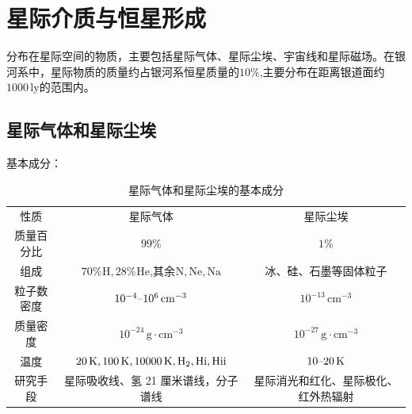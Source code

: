 \documentclass[../天体物理基础.tex]{subfiles}
\begin{document}
\section{星际介质与恒星形成}
分布在星际空间的物质，主要包括星际气体、星际尘埃、宇宙线和星际磁场。在银河系中，星际物质的质量约占银河系恒星质量的$10\%$,主要分布在距离银道面约$1000\,\mathrm{ly}$的范围内。

\subsection{星际气体和星际尘埃}
基本成分：
\begin{table}[!htbp]
\centering
\caption{星际气体和星际尘埃的基本成分}
\begin{tabular}{c c c}
\hline
性质 & 星际气体 & 星际尘埃\\
\cline{1-3}
质量百分比 & $99\%$ & $1\%$\\
\cline{1-3}
组成 & $70\%{}^{}\mathrm{H},28\%{}^{}\mathrm{He}$,其余${}^{}\mathrm{N,Ne,Na}$ & 冰、硅、石墨等固体粒子\\
\cline{1-3}
粒子数密度 & $10^{-4}\text{\textendash}10^{6}\,\mathrm{cm^{-3}}$ & $10^{-13}\,\mathrm{cm^{-3}}$\\
\cline{1-3}
质量密度 & $10^{-24}\,\mathrm{g\cdot cm^{-3}}$ & $10^{-27}\,\mathrm{g\cdot cm^{-3}}$\\
\cline{1-3}
温度 & $20\,\mathrm{K},100\,\mathrm{K},10000\,\mathrm{K},\mathrm{H}_{2},\mathrm{H\uppercase\expandafter{\romannumeral1}},\mathrm{H\uppercase\expandafter{\romannumeral2}}$ & $10\text{\textendash}20\,\mathrm{K}$\\
\cline{1-3}
研究手段 & 星际吸收线、氢 21 厘米谱线，分子谱线 & 星际消光和红化、星际极化、红外热辐射\\
\hline
\end{tabular}
\label{}
\end{table}
\end{document}
